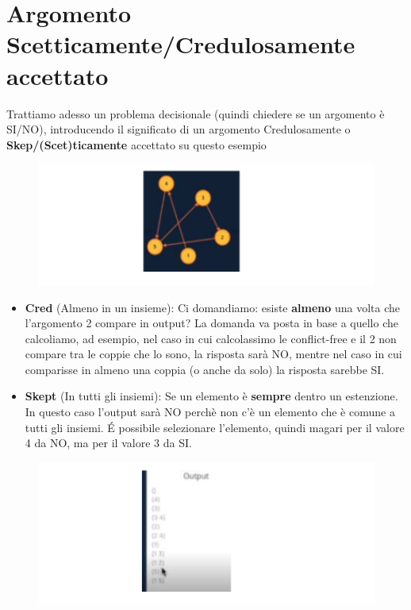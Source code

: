 \section{Argomento Scetticamente/Credulosamente accettato}
Trattiamo adesso un problema decisionale (quindi chiedere se un argomento è SI/NO), introducendo il significato di un argomento Credulosamente o \textbf{Skep/(Scet)ticamente }accettato su questo esempio
\newpage
\begin{figure}[htp]
	\centering
    \includegraphics[width=12cm, keepaspectratio]{img/Cap6/scet.png}
\end{figure}
\begin{itemize}
    \item \textbf{Cred} (Almeno in un insieme): Ci domandiamo: esiste \textbf{almeno} una volta che l’argomento 2 compare in output? La domanda va posta in base a quello che calcoliamo, ad esempio, nel caso in cui calcolassimo le conflict-free e il 2 non compare tra le coppie che lo sono, la risposta sarà NO, mentre nel caso in cui comparisse in almeno una coppia (o anche da solo) la risposta sarebbe SI.
    \item \textbf{Skept} (In tutti gli insiemi): Se un elemento è \textbf{sempre} dentro un estenzione. In questo caso l’output sarà NO perchè non c’è un elemento che è comune a tutti gli insiemi. É possibile selezionare l’elemento, quindi magari per il valore 4 da NO, ma per il valore 3 da SI.
\end{itemize}
\begin{figure}[htp]
	\centering
    \includegraphics[width=12cm, keepaspectratio]{img/Cap6/skep.png}
\end{figure}
\newpage
